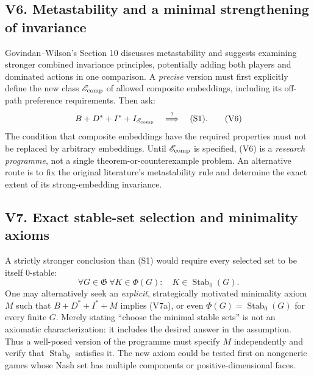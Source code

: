 \documentclass[11pt]{article}
\newcommand{\Stab}{\operatorname{Stab}_0}
\begin{document}
\subsection*{V6. Metastability and a minimal strengthening of invariance}
Govindan--Wilson's Section 10 discusses metastability and suggests
examining stronger combined invariance principles, potentially adding
both players and dominated actions in one comparison. A \emph{precise}
version must first explicitly define the new class $\mathscr E_{\rm comp}$
of allowed composite embeddings, including its off-path preference
requirements. Then ask:
\[
 B+D^*+I^*+I_{\mathscr E_{\rm comp}}
 \quad\stackrel{?}{\Longrightarrow}\quad\text{(S1)}.
 \tag{V6}
\]
The condition that composite embeddings have the required properties
must not be replaced by arbitrary embeddings. Until
$\mathscr E_{\rm comp}$ is specified, (V6) is a \emph{research programme},
not a single theorem-or-counterexample problem. An alternative route is
to fix the original literature's metastability rule and determine the
exact extent of its strong-embedding invariance.

\subsection*{V7. Exact stable-set selection and minimality axioms}
A strictly stronger conclusion than (S1) would require every
selected set to be itself $0$-stable:
\[
 \forall G\in\mathfrak G\ \forall K\in\Phi(G):\quad
 K\in\Stab(G).
 \tag{V7a}
\]
One may alternatively seek an \emph{explicit}, strategically motivated
minimality axiom $M$ such that $B+D^*+I^*+M$ implies (V7a), or even
$\Phi(G)=\Stab(G)$ for every finite $G$. Merely stating ``choose the
minimal stable sets'' is not an axiomatic characterization: it includes
the desired answer in the assumption. Thus a well-posed version of the
programme must specify $M$ independently and verify that $\Stab$
satisfies it. The new axiom could be tested first on nongeneric games
whose Nash set has multiple components or positive-dimensional faces.
\end{document}
